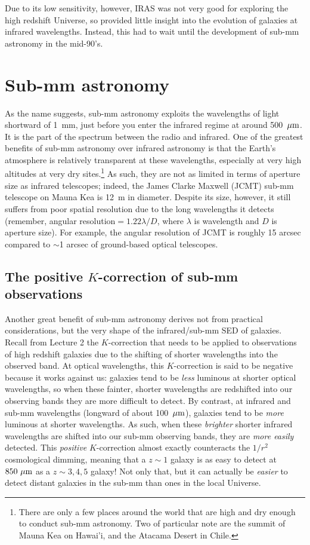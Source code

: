 \documentclass[11pt]{article}
\begin{document}
Due to its low sensitivity, however, IRAS was not very good for
exploring the high redshift Universe, so provided little insight into
the evolution of galaxies at infrared wavelengths. Instead, this had
to wait until the development of sub-mm astronomy in the mid-90's.

\section{Sub-mm astronomy}
As the name suggests, sub-mm astronomy exploits the wavelengths of
light shortward of 1~mm, just before you enter the infrared regime at
around 500~${\rm \mu m}$. It is the part of the spectrum between the
radio and infrared. One of the greatest benefits of sub-mm astronomy
over infrared astronomy is that the Earth's atmosphere is relatively
transparent at these wavelengths, especially at very high altitudes at
very dry sites.\footnote{There are only a few places around the world
  that are high and dry enough to conduct sub-mm astronomy. Two of
  particular note are the summit of Mauna Kea on Hawai'i, and the
  Atacama Desert in Chile.} As such, they are not as limited in terms
of aperture size as infrared telescopes; indeed, the James Clarke
Maxwell (JCMT) sub-mm telescope on Mauna Kea is 12~m in
diameter. Despite its size, however, it still suffers from poor
spatial resolution due to the long wavelengths it detects (remember,
angular resolution$=1.22\lambda/D$, where $\lambda$ is wavelength and
$D$ is aperture size). For example, the angular resolution of JCMT is
roughly 15 arcsec compared to $\sim$1 arcsec of ground-based optical
telescopes.

\subsection{The positive $K$-correction of sub-mm observations}

Another great benefit of sub-mm astronomy derives not from practical
considerations, but the very shape of the infrared/sub-mm SED of
galaxies. Recall from Lecture 2 the $K$-correction that needs to be
applied to observations of high redshift galaxies due to the shifting
of shorter wavelengths into the observed band. At optical wavelengths,
this $K$-correction is said to be negative because it works against
us: galaxies tend to be {\it less} luminous at shorter optical
wavelengths, so when these fainter, shorter wavelengths are redshifted
into our observing bands they are more difficult to detect. By
contrast, at infrared and sub-mm wavelengths (longward of about
100~${\rm \mu m}$), galaxies tend to be {\it more} luminous at shorter
wavelengths. As such, when these {\it brighter} shorter infrared
wavelengths are shifted into our sub-mm observing bands, they are {\it
  more easily} detected. This {\it positive} $K$-correction almost
exactly counteracts the $1/r^2$ cosmological dimming, meaning that a
$z\sim1$ galaxy is as easy to detect at $850~\rm {\mu m}$ as a
$z\sim3,4,5$ galaxy! Not only that, but it can actually be {\it easier} to
detect distant galaxies in the sub-mm than ones in the local Universe. 
\end{document}
